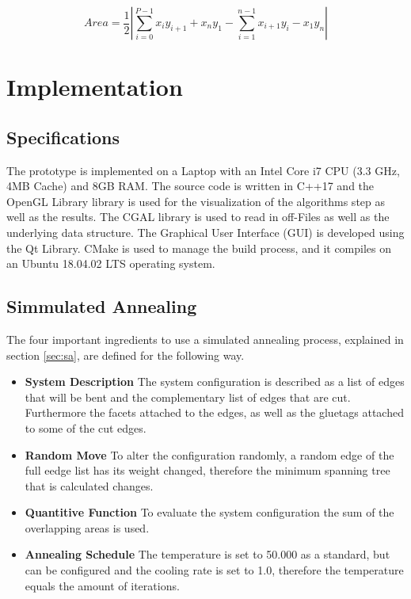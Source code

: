 \documentclass[draft,final]{vutinfth} %
\begin{document}
\begin{equation}
Area = \frac{1}{2} \left| \sum_{i=0}^{P-1} x_iy_{i+1} + x_ny_1 - \sum_{i=1}^{n-1} x_{i+1}y_i - x_1y_n \right|
\label{eq:shoelace}
\end{equation}

\chapter{Implementation}
\label{chap:Implementation}

\section{Specifications}

The prototype is implemented on a Laptop with an Intel Core i7 CPU (3.3 GHz, 4MB Cache) and 8GB RAM. The source code is written in C++17 and the OpenGL Library library is used for the visualization of the algorithms step as well as the results. The CGAL library is used to read in off-Files as well as the underlying data structure. The Graphical User Interface (GUI) is developed using the Qt Library. CMake is used to manage the build process, and it compiles on an Ubuntu 18.04.02 LTS operating system.

\section{Simmulated Annealing}

The four important ingredients to use a simulated annealing process, explained in section \ref{sec:sa}, are defined for the following way.
\begin{itemize}
	\item \textbf{System Description} The system configuration is described as a list of edges that will be bent and the complementary list of edges that are cut. Furthermore the facets attached to the edges, as well as the gluetags attached to some of the cut edges.
	\item \textbf{Random Move} To alter the configuration randomly, a random edge of the full eedge list has its weight changed, therefore the minimum spanning tree that is calculated changes.
	\item \textbf{Quantitive Function} To evaluate the system configuration the sum of the overlapping areas is used.
	\item \textbf{Annealing Schedule} The temperature is set to 50.000 as a standard, but can be configured and the cooling rate is set to 1.0, therefore the temperature equals the amount of iterations.
\end{itemize}
\end{document}
